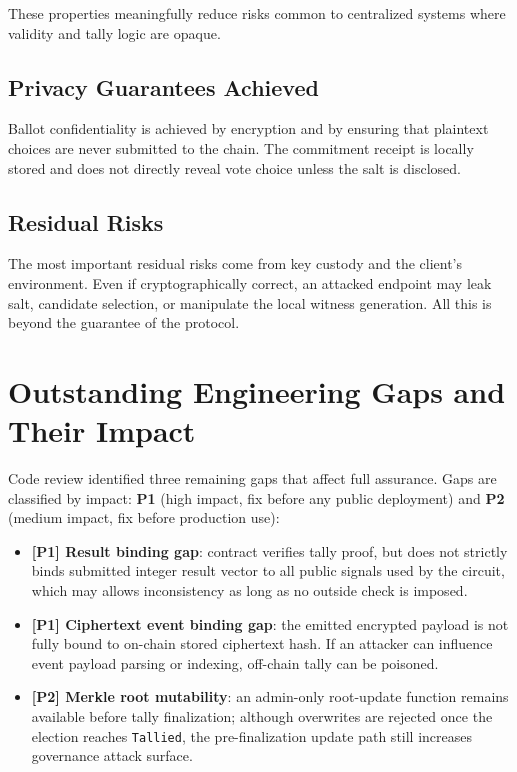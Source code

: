 These properties meaningfully reduce risks common to centralized systems where validity and tally logic are opaque.

\subsection{Privacy Guarantees Achieved}

Ballot confidentiality is achieved by encryption and by ensuring that plaintext choices are never submitted to the chain. The commitment receipt is locally stored and does not directly reveal vote choice unless the salt is disclosed.

\subsection{Residual Risks}

The most important residual risks come from key custody and the client's environment. Even if cryptographically correct, an attacked endpoint may leak salt, candidate selection, or manipulate the local witness generation. All this is beyond the guarantee of the protocol.

\section{Outstanding Engineering Gaps and Their Impact}

Code review identified three remaining gaps that affect full assurance. Gaps are classified by impact: \textbf{P1} (high impact, fix before any public deployment) and \textbf{P2} (medium impact, fix before production use):
\begin{itemize}
    \item \textbf{[P1] Result binding gap}: contract verifies tally proof, but does not strictly binds submitted integer result vector to all public signals used by the circuit, which may allows inconsistency as long as no outside check is imposed.
    \item \textbf{[P1] Ciphertext event binding gap}: the emitted encrypted payload is not fully bound to on-chain stored ciphertext hash. If an attacker can influence event payload parsing or indexing, off-chain tally can be poisoned.
    \item \textbf{[P2] Merkle root mutability}: an admin-only root-update function remains available before tally finalization; although overwrites are rejected once the election reaches \texttt{Tallied}, the pre-finalization update path still increases governance attack surface.
\end{itemize}

